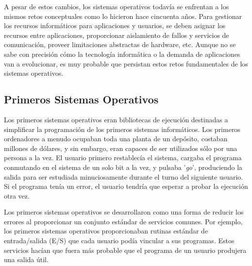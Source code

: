 \documentclass[10pt]{book}
\begin{document}
A pesar de estos cambios, los sistemas operativos todavía se enfrentan a los mismos retos conceptuales como lo hicieron hace cincuenta años. Para gestionar los recursos informáticos para aplicaciones y usuarios, se deben asignar los recursos entre aplicaciones, proporcionar aislamiento de fallos y servicios de comunicación, proveer limitaciones abstractas de hardware, etc. Aunque no se sabe con precisión cómo la tecnología informática o la demanda de aplicaciones van a evolucionar, es muy probable que persistan estos retos fundamentales de los sistemas operativos.

\subsection{Primeros Sistemas Operativos}
Los primeros sistemas operativos eran bibliotecas de ejecución destinadas a simplificar la programación de los primeros sistemas informáticos. Los primeros ordenadores a menudo ocupaban toda una planta de un depósito, costaban millones de dólares, y sin embargo, eran capaces de ser utilizados sólo por una persona a la vez. El usuario primero restablecía el sistema, cargaba el programa conmutando en el sistema de un solo bit a la vez, y pulsaba '\textit{go}', produciendo la salida para ser estudiada minuciosamente durante el turno del siguiente usuario. Si el programa tenía un error, el usuario tendría que esperar a probar la ejecución otra vez.

Los primeros sistemas operativos se desarrollaron como una forma de reducir los errores al proporcionar un conjunto estándar de servicios comunes. Por ejemplo, los primeros sistemas operativos proporcionaban rutinas estándar de entrada/salida (E/S) que cada usuario podía vincular a sus programas. Estos servicios hacían que fuera más probable que el programa de un usuario produjera una salida útil.
\end{document}
